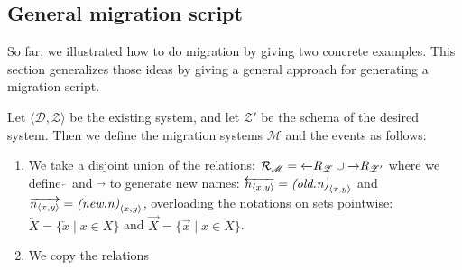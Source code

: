 \documentclass[runningheads]{llncs}
\newcommand{\id}[1]{\text{\it #1\/}}
\newcommand{\declare}[3]{\id{#1}_{\pair{#2}{#3}}}
\newcommand{\pair}[2]{\langle{#1},{#2}\rangle}
\newcommand{\rels}{\mathcal{R}}   %
\newcommand{\dataset}{\mathscr{D}}
\newcommand{\schema}{\mathscr{Z}}
\newcommand{\migrsys}{\mathscr{M}}
\begin{document}

\subsection{General migration script}
   So far, we illustrated how to do migration by giving two concrete examples.
   This section generalizes those ideas by giving a general approach for generating a migration script.
   
   Let $\pair{\dataset}{\schema}$ be the existing system, and let ${\schema'}$ be the schema of the desired system.
   Then we define the migration systems $\migrsys$ and the events as follows:
   \begin{enumerate}
   \item We take a disjoint union of the relations: $\rels_\migrsys = \overleftarrow\rels_{\schema} \cup \overrightarrow\rels_{\schema'}$
     where we define $\overleftarrow~$ and $\overrightarrow~$ to generate new names: $\overleftarrow{\declare{n}{x}{y}}=\declare{(old.n)}{x}{y}$ and $\overrightarrow{\declare{n}{x}{y}}=\declare{(new.n)}{x}{y}$,
     overloading the notations on sets pointwise: $\overleftarrow{X} = \{\overleftarrow{x}\mid x\in X\}$ and $\overrightarrow{X} = \{\overrightarrow{x}\mid x\in X\}$.
   \item We copy the relations 
   \end{enumerate}
   
\end{document}
